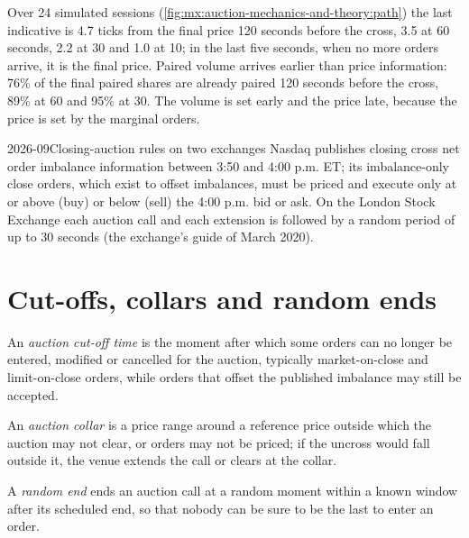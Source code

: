 Over 24 simulated sessions (\cref{fig:mx:auction-mechanics-and-theory:path}) the last indicative is 4.7 ticks from the final price 120 seconds before the
cross, 3.5 at 60 seconds, 2.2 at 30 and 1.0 at 10; in the last five seconds, when no more orders arrive, it is the final price. Paired volume arrives
earlier than price information: 76\% of the final paired shares are already paired 120 seconds before the cross, 89\% at 60 and 95\% at 30. The volume is
set early and the price late, because the price is set by the marginal orders.

\begin{dated}{2026-09}{Closing-auction rules on two exchanges}\label{dat:mx:auction-mechanics-and-theory:rules}
Nasdaq publishes closing cross net order imbalance information between 3:50 and 4:00 p.m. ET; its imbalance-only close orders, which exist to offset
imbalances, must be priced and execute only at or above (buy) or below (sell) the 4:00 p.m. bid or ask. On the London Stock Exchange each auction call and
each extension is followed by a random period of up to 30 seconds (the exchange's guide of March 2020).
\end{dated}

\section{Cut-offs, collars and random ends}

\begin{definition}\label{def:mx:auction-mechanics-and-theory:cutoff}
An \emph{auction cut-off time} is the moment after which some orders can no longer be entered, modified or cancelled for the
auction, typically market-on-close and limit-on-close orders, while orders that offset the published imbalance may still be accepted.
\end{definition}

\begin{definition}\label{def:mx:auction-mechanics-and-theory:collar}
An \emph{auction collar} is a price range around a reference price outside which the auction may not clear, or orders may not be
priced; if the uncross would fall outside it, the venue extends the call or clears at the collar.
\end{definition}

\begin{definition}\label{def:mx:auction-mechanics-and-theory:randomend}
A \emph{random end} ends an auction call at a random moment within a known window after its scheduled end, so that nobody can be sure
to be the last to enter an order.
\end{definition}

